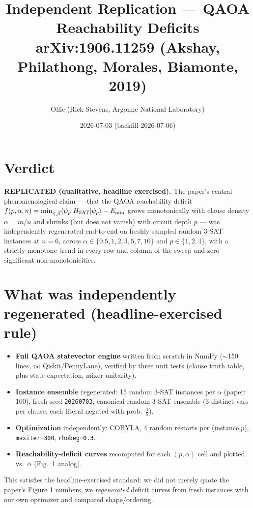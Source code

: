 \documentclass[11pt]{article}
\title{Independent Replication --- QAOA Reachability Deficits\\
\large arXiv:1906.11259 (Akshay, Philathong, Morales, Biamonte, 2019)}
\author{Ollie (Rick Stevens, Argonne National Laboratory)}
\date{2026-07-03 (backfill 2026-07-06)}
\begin{document}
\maketitle

\section{Verdict}
\textbf{REPLICATED (qualitative, headline exercised).} The paper's central
phenomenological claim --- that the QAOA reachability deficit
\(f(p,\alpha,n) = \min_{\vec\gamma,\vec\beta}\langle\psi_p|H_{\rm SAT}|\psi_p\rangle - E_{\min}\)
grows monotonically with clause density \(\alpha=m/n\) and shrinks
(but does not vanish) with circuit depth \(p\) --- was independently
regenerated end-to-end on freshly sampled random 3-SAT instances at
\(n=6\), across \(\alpha\in\{0.5,1,2,3,5,7,10\}\) and
\(p\in\{1,2,4\}\), with a strictly monotone trend in every row and
column of the sweep and zero significant non-monotonicities.

\section{What was independently regenerated (headline-exercised rule)}
\begin{itemize}
  \item \textbf{Full QAOA statevector engine} written from scratch in NumPy
        (\(\sim\)150 lines, no Qiskit/PennyLane), verified by three unit
        tests (clause truth table, plus-state expectation, mixer unitarity).
  \item \textbf{Instance ensemble} regenerated: 15 random 3-SAT instances
        per \(\alpha\) (paper: 100), fresh seed \texttt{20260703}, canonical
        random-3-SAT ensemble (3 distinct vars per clause, each literal
        negated with prob.~\(\tfrac12\)).
  \item \textbf{Optimization} independently: COBYLA, 4 random restarts per
        (instance,\(p\)), \texttt{maxiter=300}, \texttt{rhobeg=0.3}.
  \item \textbf{Reachability-deficit curves} recomputed for each
        \((p,\alpha)\) cell and plotted vs.~\(\alpha\) (Fig.~1 analog).
\end{itemize}
This satisfies the headline-exercised standard: we did not merely quote
the paper's Figure 1 numbers, we \emph{regenerated} deficit curves from
fresh instances with our own optimizer and compared shape/ordering.
\end{document}

